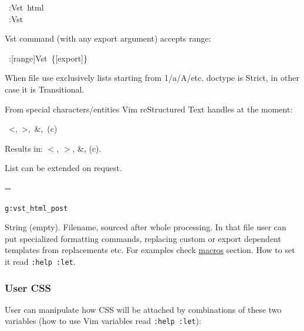\documentclass[12pt]{article}
\newenvironment{deflist}[1]{%
\begin{list}{}
{\renewcommand{\makelabel}[1]{\textbf{##1}\hfill}
\settowidth{\labelwidth}{\textbf{#1}}
\leftmargin=\labelwidth
\advance \leftmargin\labelsep}}
{\end{list}}
\begin{document}
\begin{ttfamily}\begin{flushleft}
\mbox{~:Vst~html}\\
\mbox{~:Vst}\\
\end{flushleft}\end{ttfamily}

Vst command (with any export argument) accepts range:

\begin{ttfamily}\begin{flushleft}
\mbox{~:[range]Vst~\{[export]\}}\\
\end{flushleft}\end{ttfamily}

When file use exclusively lists starting from 1/a/A/etc. doctype is Strict, in
other case it is Transitional.

From special characters/entities Vim reStructured Text handles at the moment:

\begin{ttfamily}\begin{flushleft}
\mbox{~<,~>,~\&,~(c)}\\
\end{flushleft}\end{ttfamily}

Results in: $<$, $>$, \&, (c).

List can be extended on request.

\hypertarget{lvhp}{}

\begin{deflist}{iii}

\item[\texttt{g:vst\_html\_post}]

String (empty). Filename, sourced after whole processing. In that file
user can put specialized formatting commands, replacing custom or export
dependent templates from replacements etc. For examples check \href{\#lmacros}{macros}
section. How to set it read \texttt{:help :let}.
\end{deflist}
\hypertarget{luser-css}{}
\subsubsection{User CSS}

User can manipulate how CSS will be attached by combinations of these two
variables (how to use Vim variables read \texttt{:help :let}):
\end{document}
